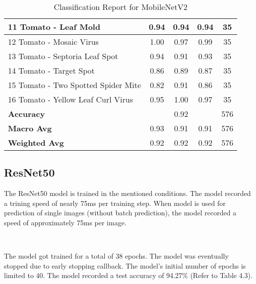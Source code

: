 \begin{table}[h!]
{\begin{tabular}{|l|c|c|c|c|}
    11 Tomato - Leaf Mold                             & 0.94               & 0.94            & 0.94              & 35               \\ \hline
    12 Tomato - Mosaic Virus                          & 1.00               & 0.97            & 0.99              & 35               \\ \hline
    13 Tomato - Septoria Leaf Spot                    & 0.94               & 0.91            & 0.93              & 35               \\ \hline
    14 Tomato - Target Spot                           & 0.86               & 0.89            & 0.87              & 35               \\ \hline
    15 Tomato - Two Spotted Spider Mite               & 0.82               & 0.91            & 0.86              & 35               \\ \hline
    16 Tomato - Yellow Leaf Curl Virus                & 0.95               & 1.00            & 0.97              & 35               \\ \hline
    \textbf{Accuracy}                                 & \multicolumn{3}{c|}{0.92}            & 576              \\ \hline
    \textbf{Macro Avg}                                & 0.93               & 0.91            & 0.91              & 576              \\ \hline
    \textbf{Weighted Avg}                             & 0.92               & 0.92            & 0.92              & 576              \\ \hline
    \end{tabular}%
    }
    \caption{Classification Report for MobileNetV2}
    \label{tab:classification_report_mnv2}
\end{table}

\subsection{ResNet50}

The ResNet50 model is trained in the mentioned conditions. The model recorded a trining speed of nearly 75ms per training step. When model is used for prediction of single images (without batch prediction), the model recorded a speed of approximately 75ms per image. 

\

The model got trained for a total of 38 epochs. The model was eventually stopped due to early stopping callback. The model's initial number of epochs is limited to 40. The model recorded a test accuracy of 94.27\% (Refer to Table 4.3).

